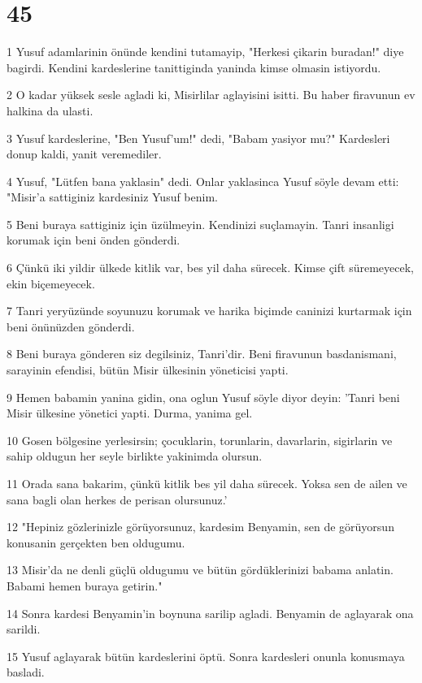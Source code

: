 \chapter{45}

\par 1 Yusuf adamlarinin önünde kendini tutamayip, "Herkesi çikarin buradan!" diye bagirdi. Kendini kardeslerine tanittiginda yaninda kimse olmasin istiyordu.
\par 2 O kadar yüksek sesle agladi ki, Misirlilar aglayisini isitti. Bu haber firavunun ev halkina da ulasti.
\par 3 Yusuf kardeslerine, "Ben Yusuf'um!" dedi, "Babam yasiyor mu?" Kardesleri donup kaldi, yanit veremediler.
\par 4 Yusuf, "Lütfen bana yaklasin" dedi. Onlar yaklasinca Yusuf söyle devam etti: "Misir'a sattiginiz kardesiniz Yusuf benim.
\par 5 Beni buraya sattiginiz için üzülmeyin. Kendinizi suçlamayin. Tanri insanligi korumak için beni önden gönderdi.
\par 6 Çünkü iki yildir ülkede kitlik var, bes yil daha sürecek. Kimse çift süremeyecek, ekin biçemeyecek.
\par 7 Tanri yeryüzünde soyunuzu korumak ve harika biçimde caninizi kurtarmak için beni önünüzden gönderdi.
\par 8 Beni buraya gönderen siz degilsiniz, Tanri'dir. Beni firavunun basdanismani, sarayinin efendisi, bütün Misir ülkesinin yöneticisi yapti.
\par 9 Hemen babamin yanina gidin, ona oglun Yusuf söyle diyor deyin: 'Tanri beni Misir ülkesine yönetici yapti. Durma, yanima gel.
\par 10 Gosen bölgesine yerlesirsin; çocuklarin, torunlarin, davarlarin, sigirlarin ve sahip oldugun her seyle birlikte yakinimda olursun.
\par 11 Orada sana bakarim, çünkü kitlik bes yil daha sürecek. Yoksa sen de ailen ve sana bagli olan herkes de perisan olursunuz.'
\par 12 "Hepiniz gözlerinizle görüyorsunuz, kardesim Benyamin, sen de görüyorsun konusanin gerçekten ben oldugumu.
\par 13 Misir'da ne denli güçlü oldugumu ve bütün gördüklerinizi babama anlatin. Babami hemen buraya getirin."
\par 14 Sonra kardesi Benyamin'in boynuna sarilip agladi. Benyamin de aglayarak ona sarildi.
\par 15 Yusuf aglayarak bütün kardeslerini öptü. Sonra kardesleri onunla konusmaya basladi.
